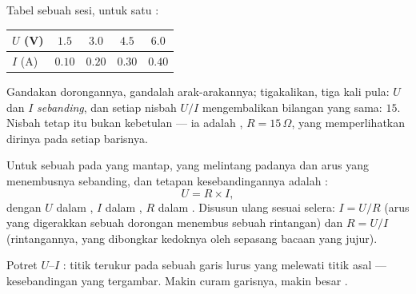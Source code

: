 \begin{example}\label{ex:g8:ohms-law:confession}
Tabel sebuah sesi, untuk satu :
\begin{center}
\begin{tabular}{l|cccc}
$U$ (\unit{V}) & $1.5$ & $3.0$ & $4.5$ & $6.0$ \\
\hline
$I$ (\unit{A}) & $0.10$ & $0.20$ & $0.30$ & $0.40$
\end{tabular}
\end{center}
Gandakan dorongannya, gandalah arak-arakannya; tigakalikan, tiga kali
pula: $U$ dan $I$ \emph{sebanding}, dan setiap nisbah $U/I$
mengembalikan bilangan yang sama: $15$. Nisbah tetap itu bukan
kebetulan --- ia adalah  , $R = 15\,\Omega$, yang
memperlihatkan dirinya pada setiap barisnya.
\end{example}

\begin{proposition}\label{prop:g8:ohms-law:law}
Untuk sebuah  pada  yang mantap,  yang melintang
padanya dan arus yang menembusnya sebanding, dan tetapan
kesebandingannya adalah :
\[
U = R \times I ,
\]
dengan $U$ dalam , $I$ dalam , $R$ dalam . Disusun ulang
sesuai selera: $I = U/R$ (arus yang digerakkan sebuah dorongan
menembus sebuah rintangan) dan $R = U/I$ (rintangannya, yang dibongkar
kedoknya oleh sepasang bacaan yang jujur).
\end{proposition}

\begin{omfigure}

{\small Potret $U$--$I$ : titik terukur pada sebuah garis
lurus yang melewati titik asal --- kesebandingan yang tergambar. Makin
curam garisnya, makin besar .}
\end{omfigure}

